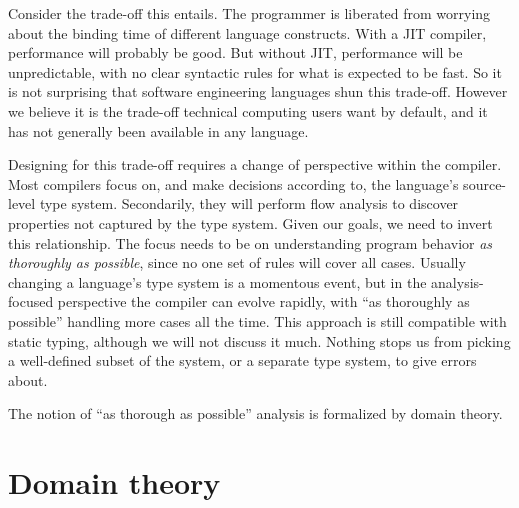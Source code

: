 Consider the trade-off this entails.
The programmer is liberated from worrying about the binding time of
different language constructs.
With a JIT compiler, performance will probably be good.
But without JIT, performance will be unpredictable, with no clear
syntactic rules for what is expected to be fast.
So it is not surprising that software engineering languages shun this
trade-off.
However we believe it is the trade-off technical computing
users want by default, and it has not generally been available
in any language.

Designing for this trade-off requires a change of perspective
within the compiler.
Most compilers focus on, and make decisions according to, the
language's source-level type system.
Secondarily, they will perform flow analysis to discover
properties not captured by the type system.
Given our goals, we need to invert this relationship.
The focus needs to be on understanding program behavior
\emph{as thoroughly as possible}, since no one set of rules
will cover all cases.
Usually changing a language's type system is a momentous event,
but in the analysis-focused perspective the compiler can evolve
rapidly, with ``as thoroughly as possible'' handling more cases
all the time.
This approach is still compatible with static typing, although we will not
discuss it much.
Nothing stops us from picking a well-defined subset of the system,
or a separate type system, to give errors about.

The notion of ``as thorough as possible'' analysis is formalized
by domain theory.




\section{Domain theory}

